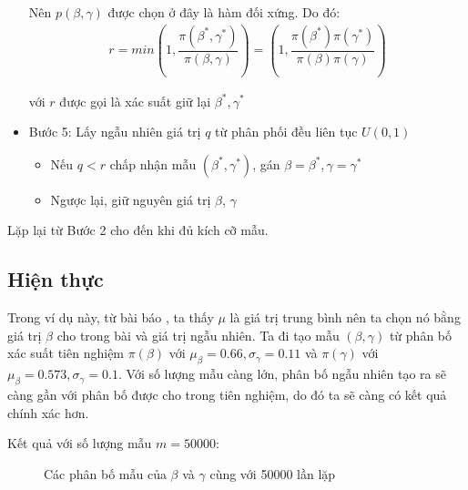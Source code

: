\documentclass[a4paper]{article}
\begin{document}
\begin{itemize}
        Nên $p(\beta, \gamma)$ được chọn ở đây là hàm đối xứng. Do đó: 
    \begin{align*}
         r = min \left( 1, \dfrac{\pi(\beta^*, \gamma^*)}{\pi(\beta, \gamma)} \right) =  \left( 1, \dfrac{\pi(\beta^*)\pi(\gamma^*)}{\pi(\beta)\pi(\gamma)} \right)
    \end{align*}
    
    với $r$ được gọi là xác suất giữ lại $\beta^*, \gamma^*$ \\ 
        
      \item Bước 5: Lấy ngẫu nhiên giá trị $q$ từ phân phối đều liên tục $U(0,1)$
      \begin{itemize}
          \item Nếu $q < r$ chấp nhận mẫu $(\beta^*, \gamma^*)$, gán $\beta = \beta^*, \gamma = \gamma^*$
          \item Ngược lại, giữ nguyên giá trị $\beta$, $\gamma$
      \end{itemize}
      
    \end{itemize}
    
    Lặp lại từ Bước 2 cho đến khi đủ kích cỡ mẫu.
\subsection{Hiện thực}
Trong ví dụ này, từ bài báo \cite{Muk}, ta thấy $\mu$ là giá trị trung bình nên ta chọn nó bằng giá trị $\beta$ cho trong bài và giá trị ngẫu nhiên. Ta đi tạo mẫu $(\beta, \gamma)$ từ phân bố xác suất tiên nghiệm $\pi(\beta) $ với $\mu_\beta = 0.66, \sigma_\gamma= 0.11$ và $\pi(\gamma)$ với $\mu_\beta = 0.573, \sigma_\gamma = 0.1$. Với số lượng mẫu càng lớn, phân bố ngẫu nhiên tạo ra sẽ càng gần với 
phân bố được cho trong tiên nghiệm, do đó ta sẽ càng có kết quả chính xác hơn. 

\newpage
Kết quả với số lượng mẫu $m=50000$:

\begin{figure}[h!]
    \centering
    \newline
    \newline
    \label{pic: test_SIR_1}
    \caption{Các phân bố mẫu của $\beta$ và $\gamma$ cùng với 50000 lần lặp}
\end{figure}
\end{document}
